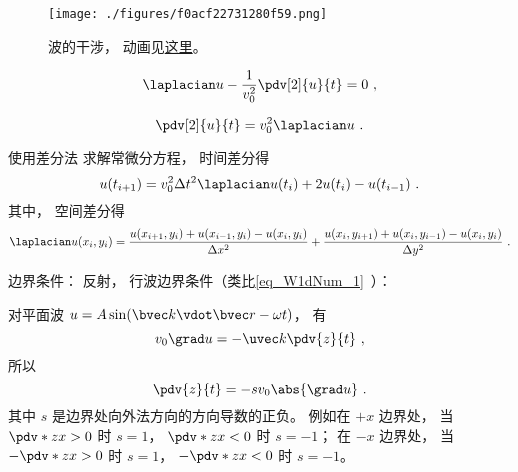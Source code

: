 
\begin{issues}
\issueDraft
\end{issues}


\begin{figure}[ht]
\centering
\texttt{[image: ./figures/f0acf22731280f59.png]}
\caption{波的干涉， 动画见\href{https://wuli.wiki/apps/wav2D.html}{这里}。} \label{fig_wav2dN_2}
\end{figure}

\begin{equation}
\laplacian u - \frac{1}{v_0^2}\pdv[2]{u}{t} = 0~,
\end{equation}

\begin{equation}
\pdv[2]{u}{t} = v_0^2\laplacian u~.
\end{equation}

使用差分法 求解常微分方程， 时间差分得
\begin{equation}
u(t_{i+1}) = v_0^2\Delta t^2\laplacian u(t_i) + 2u(t_{i}) - u(t_{i-1})~.
\end{equation}
其中， 空间差分得
\begin{equation}
\laplacian u(x_i,y_i) = \frac{u(x_{i+1}, y_i) + u(x_{i-1}, y_i) - u(x_{i}, y_i)}{\Delta x^2}
+ \frac{u(x_i, y_{i+1}) + u(x_i, y_{i-1}) - u(x_i, y_{i})}{\Delta y^2}~.
\end{equation}

边界条件： 反射， 行波边界条件（类比\autoref{eq_W1dNum_1}~）：

对平面波 $u = A\sin(\bvec k\vdot\bvec r - \omega t)$， 有
\begin{equation}
v_0\grad u = -\uvec k \pdv{z}{t}~,
\end{equation}
所以
\begin{equation}
\pdv{z}{t} = -s v_0\abs{\grad u}~.
\end{equation}
其中 $s$ 是边界处向外法方向的方向导数的正负。 例如在 $+x$ 边界处， 当 $\pdv*{z}{x} > 0$ 时 $s = 1$， $\pdv*{z}{x} < 0$ 时 $s = -1$； 在 $-x$ 边界处， 当 $-\pdv*{z}{x} > 0$ 时 $s = 1$， $-\pdv*{z}{x} < 0$ 时 $s = -1$。

